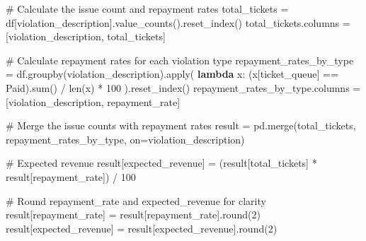 \documentclass[
  letterpaper,
  DIV=11,
  numbers=noendperiod]{scrartcl}
\newenvironment{Shaded}{\begin{snugshade}}{\end{snugshade}}
\newcommand{\BuiltInTok}[1]{\textcolor[rgb]{0.00,0.23,0.31}{#1}}
\newcommand{\CommentTok}[1]{\textcolor[rgb]{0.37,0.37,0.37}{#1}}
\newcommand{\DecValTok}[1]{\textcolor[rgb]{0.68,0.00,0.00}{#1}}
\newcommand{\KeywordTok}[1]{\textcolor[rgb]{0.00,0.23,0.31}{\textbf{#1}}}
\newcommand{\NormalTok}[1]{\textcolor[rgb]{0.00,0.23,0.31}{#1}}
\newcommand{\OperatorTok}[1]{\textcolor[rgb]{0.37,0.37,0.37}{#1}}
\newcommand{\StringTok}[1]{\textcolor[rgb]{0.13,0.47,0.30}{#1}}
\begin{document}
\begin{Shaded}
\begin{Highlighting}[]
\CommentTok{\# Calculate the issue count and repayment rates}
\NormalTok{total\_tickets }\OperatorTok{=}\NormalTok{ df[}\StringTok{\textquotesingle{}violation\_description\textquotesingle{}}\NormalTok{].value\_counts().reset\_index()}
\NormalTok{total\_tickets.columns }\OperatorTok{=}\NormalTok{ [}\StringTok{\textquotesingle{}violation\_description\textquotesingle{}}\NormalTok{, }\StringTok{\textquotesingle{}total\_tickets\textquotesingle{}}\NormalTok{]}

\CommentTok{\# Calculate repayment rates for each violation type}
\NormalTok{repayment\_rates\_by\_type }\OperatorTok{=}\NormalTok{ df.groupby(}\StringTok{\textquotesingle{}violation\_description\textquotesingle{}}\NormalTok{).}\BuiltInTok{apply}\NormalTok{(}
    \KeywordTok{lambda}\NormalTok{ x: (x[}\StringTok{\textquotesingle{}ticket\_queue\textquotesingle{}}\NormalTok{] }\OperatorTok{==} \StringTok{\textquotesingle{}Paid\textquotesingle{}}\NormalTok{).}\BuiltInTok{sum}\NormalTok{() }\OperatorTok{/} \BuiltInTok{len}\NormalTok{(x) }\OperatorTok{*} \DecValTok{100}
\NormalTok{).reset\_index()}
\NormalTok{repayment\_rates\_by\_type.columns }\OperatorTok{=}\NormalTok{ [}\StringTok{\textquotesingle{}violation\_description\textquotesingle{}}\NormalTok{, }\StringTok{\textquotesingle{}repayment\_rate\textquotesingle{}}\NormalTok{]}

\CommentTok{\# Merge the issue counts with repayment rates}
\NormalTok{result }\OperatorTok{=}\NormalTok{ pd.merge(total\_tickets, repayment\_rates\_by\_type, on}\OperatorTok{=}\StringTok{\textquotesingle{}violation\_description\textquotesingle{}}\NormalTok{)}

\CommentTok{\# Expected revenue}
\NormalTok{result[}\StringTok{\textquotesingle{}expected\_revenue\textquotesingle{}}\NormalTok{] }\OperatorTok{=}\NormalTok{ (result[}\StringTok{\textquotesingle{}total\_tickets\textquotesingle{}}\NormalTok{] }\OperatorTok{*}\NormalTok{ result[}\StringTok{\textquotesingle{}repayment\_rate\textquotesingle{}}\NormalTok{]) }\OperatorTok{/} \DecValTok{100}

\CommentTok{\# Round repayment\_rate and expected\_revenue for clarity}
\NormalTok{result[}\StringTok{\textquotesingle{}repayment\_rate\textquotesingle{}}\NormalTok{] }\OperatorTok{=}\NormalTok{ result[}\StringTok{\textquotesingle{}repayment\_rate\textquotesingle{}}\NormalTok{].}\BuiltInTok{round}\NormalTok{(}\DecValTok{2}\NormalTok{)}
\NormalTok{result[}\StringTok{\textquotesingle{}expected\_revenue\textquotesingle{}}\NormalTok{] }\OperatorTok{=}\NormalTok{ result[}\StringTok{\textquotesingle{}expected\_revenue\textquotesingle{}}\NormalTok{].}\BuiltInTok{round}\NormalTok{(}\DecValTok{2}\NormalTok{)}


\end{Highlighting}
\end{Shaded}
\end{document}
